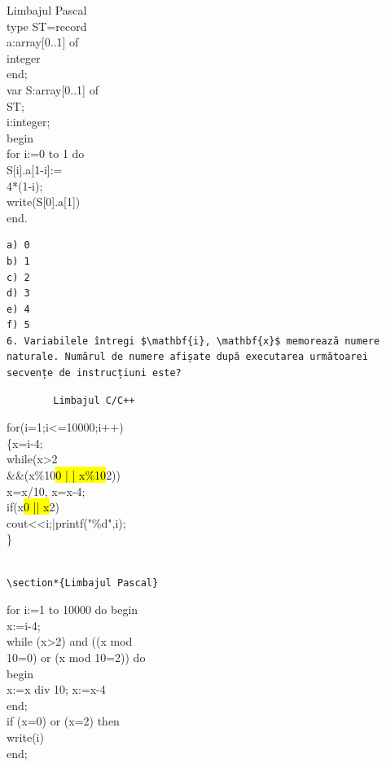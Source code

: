 \documentclass[10pt]{article}
\begin{document}
\begin{verbatim}

\end{verbatim}

Limbajul Pascal\\
type ST=record\\[0pt]
a:array[0..1] of\\
integer\\
end;\\[0pt]
var S:array[0..1] of\\
ST;\\
i:integer;\\
begin\\
for i:=0 to 1 do\\[0pt]
S[i].a[1-i]:=\\
4*(1-i);\\[0pt]
write(S[0].a[1])\\
end.

\begin{verbatim}
a) 0
b) 1
c) 2
d) 3
e) 4
f) 5
6. Variabilele întregi $\mathbf{i}, \mathbf{x}$ memorează numere naturale. Numărul de numere afișate după executarea următoarei secvențe de instrucțiuni este?
\end{verbatim}

\begin{verbatim}
        Limbajul C/C++
\end{verbatim}

for(i=1;i<=10000;i++)\\
\{x=i-4;\\
while(x>2\\
\&\&(x\%10\hl{0 | | x\%10}2))\\
x=x/10, x=x-4;\\
if(x\hl{0 || x}2)\\
cout<<i;|printf("\%d",i);\\
\}

\begin{verbatim}

\section*{Limbajul Pascal}
\end{verbatim}

for i:=1 to 10000 do begin\\
x:=i-4;\\
while (x>2) and ((x mod\\
10=0) or (x mod 10=2)) do\\
begin\\
x:=x div 10; x:=x-4\\
end;\\
if (x=0) or (x=2) then\\
write(i)\\
end;
\end{document}

